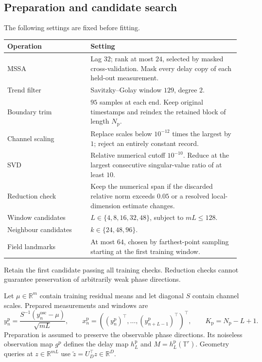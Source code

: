 \documentclass[11pt,a4paper]{article}
\newcommand{\R}{\mathbb R}
\newcommand{\T}{\mathbb T}
\begin{document}
\subsection*{Preparation and candidate search}
The following settings are fixed before fitting.
\begin{center}
\begin{tabular}{@{}p{0.34\linewidth}p{0.61\linewidth}@{}}
\toprule
Operation & Setting\\
\midrule
MSSA & Lag $32$; rank at most $24$, selected by masked cross-validation.
Mask every delay copy of each held-out measurement.\\
Trend filter & Savitzky--Golay window $129$, degree $2$.\\
Boundary trim & $95$ samples at each end. Keep original timestamps and
reindex the retained block of length $N_{\mathrm p}$.\\
Channel scaling & Replace scales below $10^{-12}$ times the largest by $1$;
reject an entirely constant record.\\
SVD & Relative numerical cutoff $10^{-10}$. Reduce at the largest
consecutive singular-value ratio of at least $10$.\\
Reduction check & Keep the numerical span if the discarded relative norm
exceeds $0.05$ or a resolved local-dimension estimate changes.\\
Window candidates & $L\in\{4,8,16,32,48\}$, subject to $mL\le128$.\\
Neighbour candidates & $k\in\{24,48,96\}$.\\
Field landmarks & At most $64$, chosen by farthest-point sampling
starting at the first training window.\\
\bottomrule
\end{tabular}
\end{center}
Retain the first candidate passing all training checks. Reduction checks
cannot guarantee preservation of arbitrarily weak phase directions.

Let $\mu\in\R^m$ contain training residual means and let diagonal $S$
contain channel scales. Prepared measurements and windows are
\[
y_n^{\mathrm p}=\frac{S^{-1}(y_n^{\mathrm{osc}}-\mu)}{\sqrt{mL}},
\qquad x_n^{\mathrm p}=((y_n^{\mathrm p})^\top,\ldots,
(y_{n+L-1}^{\mathrm p})^\top)^\top,
\qquad K_{\mathrm p}=N_{\mathrm p}-L+1.
\]
Preparation is assumed to preserve the observable phase directions.
Its noiseless observation map $g^{\mathrm p}$ defines the delay map
$h_L^{\mathrm p}$ and $M=h_L^{\mathrm p}(\T^r)$.
Geometry queries at $z\in\R^{mL}$ use $\widetilde z=U_D^\top z\in\R^D$.
\end{document}
